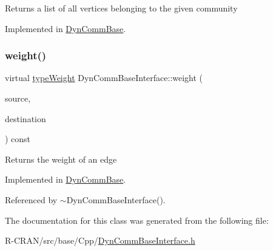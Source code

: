 \begin{DoxyReturn}{Returns}
a list of all vertices belonging to the given community 
\end{DoxyReturn}


Implemented in \hyperlink{classDynCommBase_ae56cd1fc5a69fcd4d0e0a073f3f2e36b}{Dyn\+Comm\+Base}.

\mbox{\label{classDynCommBaseInterface_a31514affa49ac05ccf3318b3558cf0b2}} 
\subsubsection{\texorpdfstring{weight()}{weight()}}
{\footnotesize\ttfamily virtual \hyperlink{edge_8h_a2e7ea3be891ac8b52f749ec73fee6dd2}{type\+Weight} Dyn\+Comm\+Base\+Interface\+::weight (\begin{DoxyParamCaption}\item[{const \hyperlink{edge_8h_a5fbd20c46956d479cb10afc9855223f6}{type\+Vertex} \&}]{source,  }\item[{const \hyperlink{edge_8h_a5fbd20c46956d479cb10afc9855223f6}{type\+Vertex} \&}]{destination }\end{DoxyParamCaption}) const\hspace{0.3cm}{\ttfamily [pure virtual]}}

\begin{DoxyReturn}{Returns}
the weight of an edge 
\end{DoxyReturn}


Implemented in \hyperlink{classDynCommBase_ae48a572da3c7b375429e96e717b15787}{Dyn\+Comm\+Base}.



Referenced by $\sim$\+Dyn\+Comm\+Base\+Interface().



The documentation for this class was generated from the following file\+:\begin{DoxyCompactItemize}
\item 
R-\/\+C\+R\+A\+N/src/base/\+Cpp/\hyperlink{DynCommBaseInterface_8h}{Dyn\+Comm\+Base\+Interface.\+h}\end{DoxyCompactItemize}
